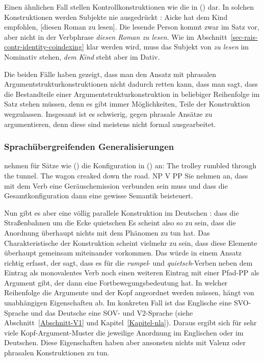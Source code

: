 Einen ähnlichen Fall stellen Kontrollkonstruktionen wie die in () dar. In solchen
Konstruktionen werden Subjekte nie ausgedrückt \citep[Abschnitt~4]{Mueller2007d}:
\ea
Aicke hat dem Kind empfohlen, [diesen Roman zu lesen].
\z
Die lesende Person kommt zwar im Satz vor, aber nicht in der Verbphrase \emph{diesen Roman zu
  lesen}. Wie im Abschnitt~\ref{sec-rais-contr-identity-coindexing} klar werden wird, muss das Subjekt von \emph{zu lesen} im Nominativ
stehen, \emph{dem Kind} steht aber im Dativ.

Die beiden Fälle haben gezeigt, dass man den Ansatz mit phrasalen Argumentstrukturkonstruktionen
nicht dadurch retten kann, dass man sagt, dass die Bestandteile einer Argumentstrukturkonstruktion
in beliebiger Reihenfolge im Satz stehen müssen, denn es gibt immer Möglichkeiten, Teile der
Konstruktion wegzulassen. Insgesamt ist es schwierig, gegen phrasale Ansätze
zu argumentieren, denn diese sind meistens nicht formal ausgearbeitet.




\subsubsection{Sprachübergreifenden Generalisierungen}
\label{sec-CxG-sprachübergreifende-Generalisierungen}

\citet[540, 541]{GJ2004a} nehmen für Sätze wie () die Konfiguration in () an:
\eal
\ex The trolley rumbled through the tunnel.
\ex The wagon creaked down the road.
\zl
\ea
NP V PP
\z
Sie nehmen an, dass mit dem Verb eine Geräuschemission verbunden sein muss und dass die
Gesamtkonfiguration dann eine gewisse Semantik beisteuert.

Nun gibt es aber eine völlig parallele Konstruktion im Deutschen \citep[922]{MuellerUnifying}:
\ea
dass die Straßenbahnen um die Ecke quietschen
\z
Es scheint also so zu sein, dass die Anordnung überhaupt nichts mit dem Phänomen zu tun hat. Das
Charakteristische der Konstruktion scheint vielmehr zu sein, dass diese Elemente überhaupt gemeinsam miteinander vorkommen. Das würde in einem Ansatz
richtig erfasst, der sagt, dass es für die \emph{rumpel}- und \emph{quietsch}-Verben neben dem
Eintrag als monovalentes Verb noch einen weiteren Eintrag mit einer Pfad-PP als Argument gibt, der
dann eine Fortbewegungsbedeutung hat. In welcher Reihenfolge die Argumente und der Kopf angeordnet
werden müssen, hängt von unabhängigen Eigenschaften ab. Im konkreten Fall ist das Englische eine
SVO-Sprache und das Deutsche eine SOV- und V2-Sprache (siehe Abschnitt~\ref{Abschnitt-V1} und
Kapitel~\ref{Kapitel-nla}). Daraus ergibt sich für sehr viele Kopf-Argument-Muster die jeweilige
Anordnung im Englischen oder im Deutschen. Diese Eigenschaften haben aber ansonsten
nichts mit Valenz oder phrasalen Konstruktionen zu tun.

